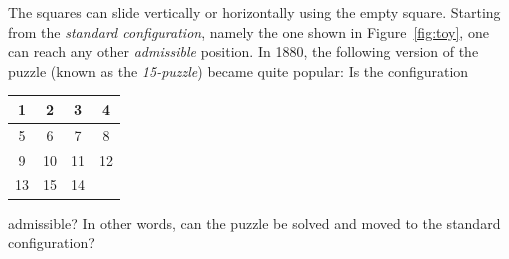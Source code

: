 
The squares can slide vertically or horizontally using the empty square. Starting from the \emph{standard configuration}, 
namely the one shown in Figure~\ref{fig:toy}, one can reach any other \emph{admissible} position.
In 1880, the following version of the puzzle (known as the \emph{15-puzzle}) 
became quite popular: Is the configuration 
\bigskip 
    \begin{center}
        \begin{tabular}{|c|c|c|c|}
            \hline
            1 & 2 & 3 & 4\\
            \hline
            5 & 6 & 7 & 8\\
            \hline
            9 & 10 & 11 & 12\\
            \hline
            13 & 15 & 14 & \\
            \hline
        \end{tabular}
    \end{center}
\bigskip 
admissible? In other words, can the puzzle be solved and moved to the standard configuration? 

